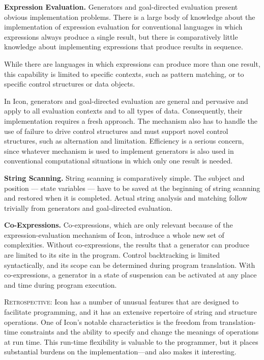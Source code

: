 \textbf{Expression Evaluation.} Generators and goal-directed
evaluation present obvious implementation problems. There is a large
body of knowledge about the implementation of expression evaluation
for conventional languages in which expressions always produce a
single result, but there is comparatively little knowledge about
implementing expressions that produce results in sequence.

While there are languages in which expressions can produce more than
one result, this capability is limited to specific contexts, such as
pattern matching, or to specific control structures or data objects.

In Icon, generators and goal-directed evaluation are general and
pervasive and apply to all evaluation contexts and to all types of
data. Consequently, their implementation requires a fresh
approach. The mechanism also has to handle the use of failure to drive
control structures and must support novel control structures, such as
alternation and limitation. Efficiency is a serious concern, since
whatever mechanism is used to implement generators is also used in
conventional computational situations in which only one result is
needed.


\textbf{String Scanning.} String scanning is comparatively simple. The
subject and position --- {\textquotedbl}state variables{\textquotedbl}
--- have to be saved at the beginning of string scanning and restored
when it is completed.  Actual string analysis and matching follow
trivially from generators and goal-directed evaluation.


\textbf{Co-Expressions.} Co-expressions, which are only relevant
because of the expression-evaluation mechanism of Icon, introduce a
whole new set of complexities. Without co-expressions, the results
that a generator can produce are limited to its site in the
program. Control backtracking is limited syntactically, and its scope
can be determined during program translation. With co-expressions, a
generator in a state of suspension can be activated at any place and
time during program execution.


\textsc{Retrospective}: Icon has a number of unusual features that are
designed to facilitate programming, and it has an extensive repertoire
of string and structure operations. One of Icon's notable
characteristics is the freedom from translation-time constraints and
the ability to specify and change the meanings of operations at run
time. This run-time flexibility is valuable to the programmer, but it
places substantial burdens on the implementation---and also makes it
interesting.

